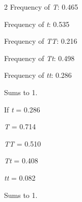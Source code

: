 \begin{solution}
	\begin{multicols}{2}
\vspace{2\baselineskip}
Frequency of \textit{T}: 0.465

\vspace{2\baselineskip}
Frequency of \textit{t}: 0.535

\vspace{2\baselineskip}
Frequency of \textit{TT}: 0.216

\vspace{2\baselineskip}
Frequency of \textit{Tt}: 0.498

\vspace{2\baselineskip}
Frequency of \textit{tt}: 0.286

\vspace{\baselineskip}
Sums to 1.

	\columnbreak

\vspace{2\baselineskip}
If \textit{t} = 0.286

\vspace{2\baselineskip}
\textit{T} = 0.714

\vspace{2\baselineskip}
\textit{TT} = 0.510

\vspace{2\baselineskip}
\textit{Tt} = 0.408

\vspace{2\baselineskip}
\textit{tt} = 0.082

\vspace{\baselineskip}
Sums to 1.

\end{multicols}

\end{solution}
